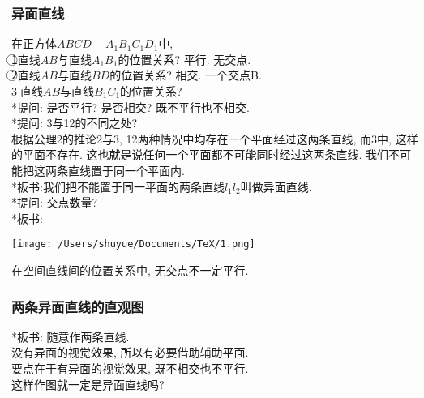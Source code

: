 \documentclass{article}
\begin{document}
\begin{CJK}{UTF8}{gkai}
\subsubsection{异面直线}
在正方体$ABCD-A_1B_1C_1D_1$中, \\
\textcircled{1}直线$AB$与直线$A_1B_1$的位置关系? 平行. 无交点.\\
\textcircled{2}直线$AB$与直线$BD$的位置关系? 相交. 一个交点B.\\
\textcircled{3}直线$AB$与直线$B_1C_1$的位置关系?\\
*提问: 是否平行? 是否相交? 既不平行也不相交.\\
*提问: 3与12的不同之处? \\
根据公理2的推论2与3, 12两种情况中均存在一个平面经过这两条直线, 而3中, 这样的平面不存在. 这也就是说任何一个平面都不可能同时经过这两条直线. 我们不可能把这两条直线置于同一个平面内.\\
*板书:我们把不能置于同一平面的两条直线$l_1 l_2$叫做异面直线.\\
*提问: 交点数量? \\
*板书: \\
\begin{center}
\texttt{[image: /Users/shuyue/Documents/TeX/1.png]}
\end{center}
在空间直线间的位置关系中, 无交点不一定平行.\\

\subsubsection{两条异面直线的直观图}
*板书: 随意作两条直线.\\
没有异面的视觉效果, 所以有必要借助辅助平面.\\
要点在于有异面的视觉效果, 既不相交也不平行.\\
这样作图就一定是异面直线吗?\\


\end{CJK}
\end{document}
